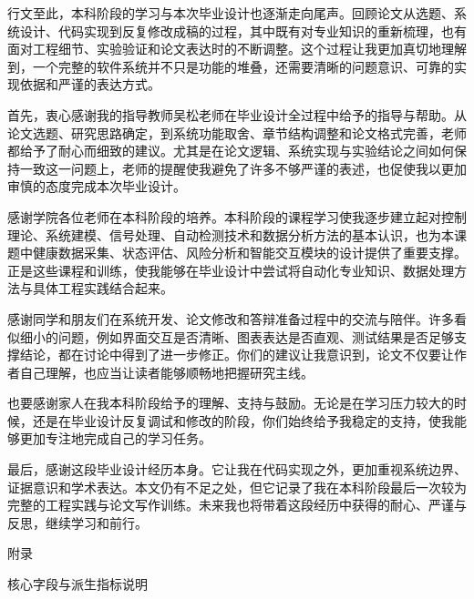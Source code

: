 \documentclass[UTF8, a4paper, 12pt, oneside]{ctexrep}
\numberwithin{equation}{chapter}
\begin{document}
{
\songti{}
\singlespacing
\noindent 行文至此，本科阶段的学习与本次毕业设计也逐渐走向尾声。回顾论文从选题、系统设计、代码实现到反复修改成稿的过程，其中既有对专业知识的重新梳理，也有面对工程细节、实验验证和论文表达时的不断调整。这个过程让我更加真切地理解到，一个完整的软件系统并不只是功能的堆叠，还需要清晰的问题意识、可靠的实现依据和严谨的表达方式。

首先，衷心感谢我的指导教师吴松老师在毕业设计全过程中给予的指导与帮助。从论文选题、研究思路确定，到系统功能取舍、章节结构调整和论文格式完善，老师都给予了耐心而细致的建议。尤其是在论文逻辑、系统实现与实验结论之间如何保持一致这一问题上，老师的提醒使我避免了许多不够严谨的表述，也促使我以更加审慎的态度完成本次毕业设计。

感谢学院各位老师在本科阶段的培养。本科阶段的课程学习使我逐步建立起对控制理论、系统建模、信号处理、自动检测技术和数据分析方法的基本认识，也为本课题中健康数据采集、状态评估、风险分析和智能交互模块的设计提供了重要支撑。正是这些课程和训练，使我能够在毕业设计中尝试将自动化专业知识、数据处理方法与具体工程实践结合起来。

感谢同学和朋友们在系统开发、论文修改和答辩准备过程中的交流与陪伴。许多看似细小的问题，例如界面交互是否清晰、图表表达是否直观、测试结果是否足够支撑结论，都在讨论中得到了进一步修正。你们的建议让我意识到，论文不仅要让作者自己理解，也应当让读者能够顺畅地把握研究主线。

也要感谢家人在我本科阶段给予的理解、支持与鼓励。无论是在学习压力较大的时候，还是在毕业设计反复调试和修改的阶段，你们始终给予我稳定的支持，使我能够更加专注地完成自己的学习任务。

最后，感谢这段毕业设计经历本身。它让我在代码实现之外，更加重视系统边界、证据意识和学术表达。本文仍有不足之处，但它记录了我在本科阶段最后一次较为完整的工程实践与论文写作训练。未来我也将带着这段经历中获得的耐心、严谨与反思，继续学习和前行。
\par}
\clearpage

{}
{\noindent\heiti{} 附录\par}
\vspace{\baselineskip}
\begin{center}
{\heiti{} 核心字段与派生指标说明\par}
\end{center}
\vspace{0.5\baselineskip}
\end{document}
